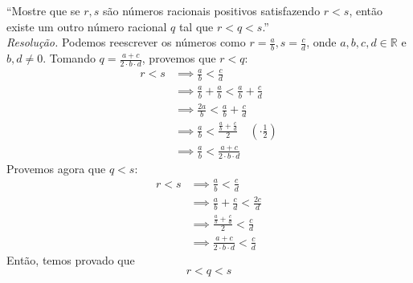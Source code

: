 \enquote{Mostre que se $r, s$ são números racionais positivos satisfazendo $r < s$, então existe um outro número racional $q$ tal que $r < q < s$.}
\\ \emph{Resolução.} Podemos reescrever os números como $r = \frac{a}{b}, s = \frac{c}{d}$, onde $a, b, c, d \in \mathbb{R}$ e $b, d \ne 0$. Tomando $ q =\frac{a + c}{2 \cdot b \cdot d}$, provemos que $r < q$:
\begin{align*}
    r < s & \implies \frac{a}{b} < \frac{c}{d} \\ & \implies
    \frac{a}{b} + \frac{a}{b} < \frac{a}{b} + \frac{c}{d} \\ & \implies
    \frac{2a}{b} < \frac{a}{b} + \frac{c}{d} \\ & \implies
    \frac{a}{b} < \frac{\frac{a}{b} + \frac{c}{d}}{2} \quad (\cdot \frac{1}{2}) \\ & \implies
    \frac{a}{b} < \frac{a + c}{2 \cdot b \cdot d}
\end{align*}
Provemos agora que $q < s$:
\begin{align*}
    r < s & \implies \frac{a}{b} < \frac{c}{d} \\ & \implies
    \frac{a}{b} + \frac{c}{d} < \frac{2c}{d} \\ & \implies
    \frac{\frac{a}{b} + \frac{c}{d}}{2} < \frac{c}{d} \\ & \implies
    \frac{a + c}{2\cdot b \cdot d} < \frac{c}{d}
\end{align*}
Então, temos provado que
\begin{displaymath}
    r < q < s
\end{displaymath}